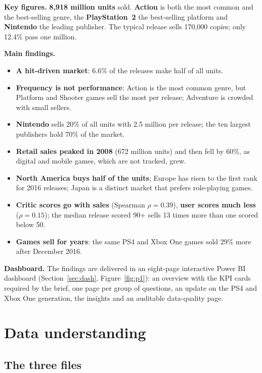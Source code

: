 \documentclass[12pt,a4paper]{article}
\begin{document}
\textbf{Key figures.} \textbf{8{,}918 million units} sold. \textbf{Action} is both the most
common and the best-selling genre, the \textbf{PlayStation~2} the best-selling platform
and \textbf{Nintendo} the leading publisher. The typical release sells 170{,}000 copies;
only 12.4\% pass one million.

\textbf{Main findings.}
\begin{itemize}
\item \textbf{A hit-driven market}: 6.6\% of the releases make half of all units.
\item \textbf{Frequency is not performance}: Action is the most common genre, but
Platform and Shooter games sell the most per release; Adventure is crowded with small sellers.
\item \textbf{Nintendo} sells 20\% of all units with 2.5 million per release; the ten
largest publishers hold 70\% of the market.
\item \textbf{Retail sales peaked in 2008} (672 million units) and then fell by 60\%, as
digital and mobile games, which are not tracked, grew.
\item \textbf{North America buys half of the units}; Europe has risen to the first rank
for 2016 releases; Japan is a distinct market that prefers role-playing games.
\item \textbf{Critic scores go with sales} (Spearman $\rho = 0.39$), \textbf{user scores
much less} ($\rho = 0.15$); the median release scored 90+ sells 13 times more than one
scored below 50.
\item \textbf{Games sell for years}: the same PS4 and Xbox One games sold 29\% more after
December 2016.
\end{itemize}

\textbf{Dashboard.} The findings are delivered in an eight-page interactive Power BI dashboard
(Section~\ref{sec:dash}, Figure~\ref{fig:p1}): an overview with the KPI cards required by the brief,
one page per group of questions, an update on the PS4 and Xbox One generation, the insights and
an auditable data-quality page.

\section{Data understanding}

\subsection{The three files}
\end{document}
